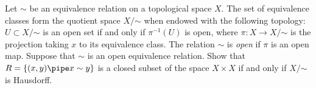 Let $\sim $ be an equivalence relation on a topological space $X$.
The set of equivalence classes form the quotient space
$X/\mathord{\sim }$ when endowed with the following topology:
$U\subset X/\mathord{\sim }$ is an open set if and only if
$\pi^{-1}(U)$ is open, where $\pi:X\rightarrow X/\mathord{\sim }$ is
the projection taking $x$ to its equivalence class.  The relation
$\sim $ is \emph{open} if $\pi$ is an open map. Suppose that $\sim $
is an open equivalence relation. Show that $R=\{(x,y)\pipe x\sim y\}$
is a closed subset of the space $X\times X$ if and only if
$X/\mathord{\sim }$ is Hausdorff.
